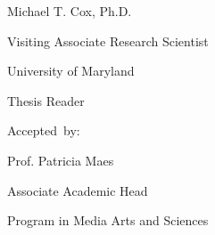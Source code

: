 \begin{addmargin}[-1cm]{-3cm}
\begin{flushright}
                                 Michael T. Cox, Ph.D.

                                 Visiting Associate Research Scientist
                                 
                                 University of Maryland

                                 Thesis Reader

  \vspace{5mm}

  Accepted~by:\hspace{0.5cm}~\makebox[2.75in]{\hrulefill}

                                 Prof. Patricia Maes

                                 Associate Academic Head

                                 Program in Media Arts and Sciences
                                 
\end{flushright}

\end{addmargin}


